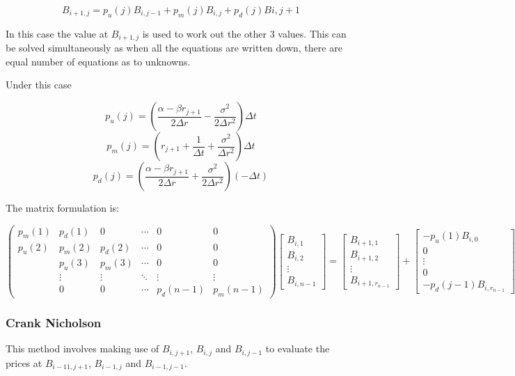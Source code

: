 \documentclass[12pt,a4paper]{article}
\begin{document}
$$B_{i+1,j}= p_u(j)B_{i,j-1}+p_m(j)B_{i,j}+p_d(j)B{i,j+1} $$

In this case the value at $B_{i+1,j}$ is used to work out the other 3 values. This can be solved simultaneously as when all the equations are written down, there are equal number of equations as to unknowns.


Under this case

$$p_u(j)= (\frac{\alpha-\beta r_{j+1}}{2\Delta r} - \frac{\sigma^2}{2\Delta r^2})\Delta t$$ 
$$p_m(j)= (r_{j+1}+\frac{1}{\Delta t} + \frac{\sigma^2}{\Delta r ^2})\Delta t$$
$$p_d(j)= (\frac{\alpha-\beta r_{j+1}}{2\Delta r} + \frac{\sigma^2}{2\Delta r^2})(-\Delta t) $$

The matrix formulation is:

$$\left( \begin{array}{cccccc}
p_m(1) & p_d(1) & 0 & \cdots  & 0 & 0\\
p_u(2) & p_m(2) & p_d(2) &\cdots & 0 & 0 \\
& p_u(3) & p_m(3) & \cdots & 0 & 0  \\
& \vdots &\vdots & \ddots & \vdots & \vdots \\ 
& 0 & 0 & \cdots & p_d(n-1) & p_m(n-1) \end{array} \right)
%
\begin{bmatrix}
B_{i,1} \\
B_{i,2} \\
\vdots \\
B_{i,n-1}
\end{bmatrix}
=
\begin{bmatrix}
B_{i+1,1} \\
B_{i+1,2} \\
\vdots \\
B_{i+1,r_{n-1}}
\end{bmatrix}
+
\begin{bmatrix}
-p_u(1)B_{i,0} \\
0 \\
\vdots \\
0 \\
-p_d(j-1)B_{i, r_{n-1}}
\end{bmatrix}
$$


\subsubsection{Crank Nicholson}

This method involves making use of $B_{i,j+1}$, $B_{i,j}$ and $B_{i,j-1}$ to evaluate the prices at $B_{i-11,j+1}$, $B_{i-1,j}$ and $B_{i-1,j-1}$. 
\end{document}
